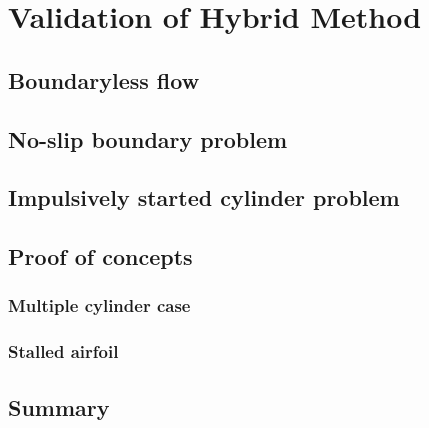 \chapter{Validation of Hybrid Method}

\section{Boundaryless flow}

\section{No-slip boundary problem}

\section{Impulsively started cylinder problem}

\section{Proof of concepts}

\subsection{Multiple cylinder case}

\subsection{Stalled airfoil}

\section{Summary}